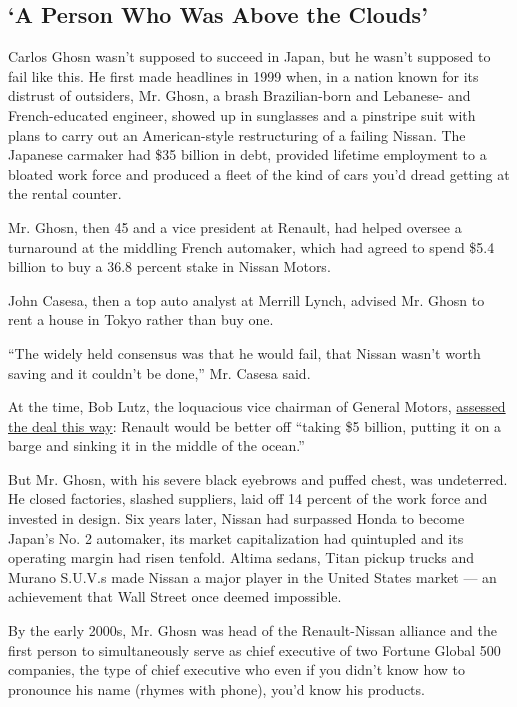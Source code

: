 \hypertarget{a-person-who-was-above-the-clouds}{%
\subsection{`A Person Who Was Above the
Clouds'}\label{a-person-who-was-above-the-clouds}}

Carlos Ghosn wasn't supposed to succeed in Japan, but he wasn't supposed
to fail like this. He first made headlines in 1999 when, in a nation
known for its distrust of outsiders, Mr. Ghosn, a brash Brazilian-born
and Lebanese- and French-educated engineer, showed up in sunglasses and
a pinstripe suit with plans to carry out an American-style restructuring
of a failing Nissan. The Japanese carmaker had \$35 billion in debt,
provided lifetime employment to a bloated work force and produced a
fleet of the kind of cars you'd dread getting at the rental counter.

Mr. Ghosn, then 45 and a vice president at Renault, had helped oversee a
turnaround at the middling French automaker, which had agreed to spend
\$5.4 billion to buy a 36.8 percent stake in Nissan Motors.

John Casesa, then a top auto analyst at Merrill Lynch, advised Mr. Ghosn
to rent a house in Tokyo rather than buy one.

``The widely held consensus was that he would fail, that Nissan wasn't
worth saving and it couldn't be done,'' Mr. Casesa said.

At the time, Bob Lutz, the loquacious vice chairman of General Motors,
\href{https://www.cnbc.com/2018/11/20/ghosn-scandal-could-trigger-crises-for-nissan-renault-mitsubishi.html}{assessed
the deal this way}: Renault would be better off ``taking \$5 billion,
putting it on a barge and sinking it in the middle of the ocean.''

But Mr. Ghosn, with his severe black eyebrows and puffed chest, was
undeterred. He closed factories, slashed suppliers, laid off 14 percent
of the work force and invested in design. Six years later, Nissan had
surpassed Honda to become Japan's No. 2 automaker, its market
capitalization had quintupled and its operating margin had risen
tenfold. Altima sedans, Titan pickup trucks and Murano S.U.V.s made
Nissan a major player in the United States market --- an achievement
that Wall Street once deemed impossible.

By the early 2000s, Mr. Ghosn was head of the Renault-Nissan alliance
and the first person to simultaneously serve as chief executive of two
Fortune Global 500 companies, the type of chief executive who even if
you didn't know how to pronounce his name (rhymes with phone), you'd
know his products.

